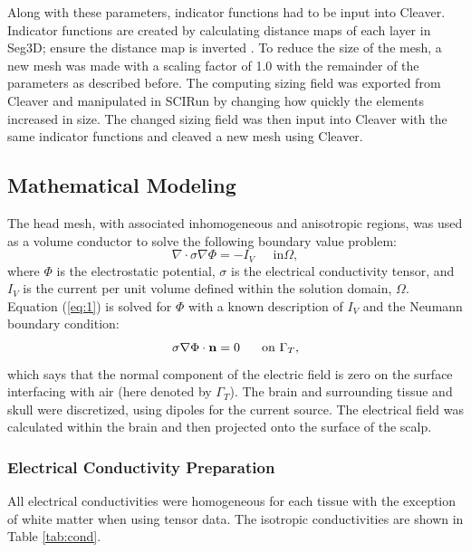  Along with these parameters, indicator functions had to be input into Cleaver. Indicator functions are created by calculating distance maps of each layer in Seg3D; ensure the distance map is inverted . To reduce the size of the mesh, a new mesh was made with a scaling factor of 1.0 with the remainder of the parameters as described before. The computing sizing field was exported from Cleaver and manipulated in SCIRun by changing how quickly the elements increased in size. The changed sizing field was then input into Cleaver with the same indicator functions and cleaved a new mesh using Cleaver.

\subsection{Mathematical Modeling}
\label{sec:math}


The head mesh, with associated inhomogeneous and anisotropic regions, was used as a volume conductor to solve the following boundary value problem:
%
\begin{equation}
\label{eq:1} \nabla\cdot\sigma\nabla\Phi = -I_{V} \;\;\;\;\mbox{ in
}\Omega,
\end{equation} 
%
where $\Phi$ is the electrostatic potential, $\sigma$ is the electrical conductivity tensor, and $I_{V}$ is the current per unit volume defined within the solution domain, $\Omega$. Equation (\ref{eq:1}) is solved for $\Phi$ with a known description of $I_{V}$ and the Neumann boundary condition:
%
\begin{equation} \sigma\nabla\Phi\cdot{\bf
n} = 0\;\;\;\;\;\mbox{ on }\Gamma_{T}, 
\end{equation} 
%
which says that the normal component of the electric field is zero on the surface interfacing with air (here denoted by $\Gamma_{T}$). The brain and surrounding tissue and skull were discretized, using dipoles for the current source. The electrical field was calculated within the brain and then projected onto the surface of the scalp. \cite{ref:math}

\subsubsection{Electrical Conductivity Preparation}
\label{sec:cond}

All electrical conductivities were homogeneous for each tissue with the exception of white matter when using tensor data. The isotropic conductivities \cite{ref:cond} are shown in Table \ref{tab:cond}.

